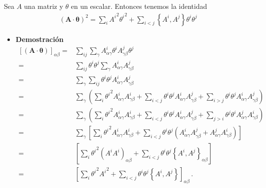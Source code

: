 \begin{frame}
Sea $A$ una matriz y $\theta$ en un escalar. Entonces tenemos la identidad
\begin{align}
  \label{eq:206qftw}
  (\boldsymbol{A}\cdot\boldsymbol{\theta})^2=\sum_i {A^i}^2 {\theta^i}^2+\sum_{i\lt j}\left\{A^i,A^j  \right\}\theta^i \theta^j 
\end{align}
\end{frame}
\begin{itemize}
\item \textbf{Demostración}
  \begin{align}
    \left[\left(\boldsymbol{A}\cdot\boldsymbol{\theta}\right)\right]_{\alpha\beta}
    =&\sum_{i j}\sum_\gamma A^i_{\alpha\gamma}\theta^iA^j_{\gamma\beta}\theta^j\nonumber\\    
    =&\sum_{i j}\theta^i\theta^j\sum_\gamma A^i_{\alpha\gamma}A^j_{\gamma\beta}\nonumber\\    
    =&\sum_\gamma \sum_{i j}\theta^i\theta^jA^i_{\alpha\gamma}A^j_{\gamma\beta}\nonumber\\    
    =&\sum_\gamma \left(\sum_{i}{\theta^i}^2A^i_{\alpha\gamma}A^i_{\gamma\beta}+\sum_{i<j}\theta^i\theta^jA^i_{\alpha\gamma}A^j_{\gamma\beta}+\sum_{i>j}\theta^i\theta^jA^i_{\alpha\gamma}A^j_{\gamma\beta}\right)\nonumber\\    
    =&\sum_\gamma \left(\sum_{i}{\theta^i}^2A^i_{\alpha\gamma}A^i_{\gamma\beta}+\sum_{i<j}\theta^i\theta^jA^i_{\alpha\gamma}A^j_{\gamma\beta}+\sum_{j>i}\theta^j\theta^iA^j_{\alpha\gamma}A^i_{\gamma\beta}\right)\nonumber\\    
    =&\sum_\gamma \left[\sum_{i}{\theta^i}^2A^i_{\alpha\gamma}A^i_{\gamma\beta}+\sum_{i<j}\theta^i\theta^j\left(A^i_{\alpha\gamma}A^j_{\gamma\beta}+A^j_{\alpha\gamma}A^i_{\gamma\beta}\right)\right]\nonumber\\    
    =&\left[\sum_{i}{\theta^i}^2\left(A^iA^i\right)_{\alpha\beta}+\sum_{i<j}\theta^i\theta^j\left\{ A^i,A^j\right\}_{\alpha\beta}\right]\nonumber\\    
    =&\left[\sum_{i}{\theta^i}^2{A^i}^2+\sum_{i<j}\theta^i\theta^j\left\{ A^i,A^j\right\}\right]_{\alpha\beta}\,.
  \end{align}

\end{itemize}

